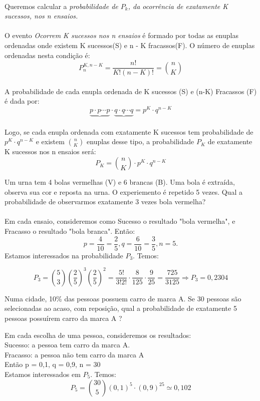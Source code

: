\documentclass[10pt,a4paper]{article}
\begin{document}
\paragraph{} Queremos calcular a \emph{probabilidade de $P_{k}$, da ocorrência de exatamente K sucessos, nos n ensaios.}
\paragraph{}O evento \textit{Ocorrem K sucessos nos n ensaios} é formado por todas as enuplas ordenadas onde existem K sucessos(S) e n - K fracassos(F). O número de enuplas ordenadas nesta condição é:
\[
	P^{K, n-K}_{n} = \frac{n!}{K!(n-K)!} = \binom{n}{K}
\]
\paragraph{}A probabilidade de cada enupla ordenada de K sucessos (S) e (n-K) Fracassos (F) é dada por:
\[
	\underbrace{p \cdot p \cdots p} \cdot \underbrace{q \cdot q \cdots q} = p^{K}\cdot q^{n-K}
\]
\paragraph{}Logo, se cada enupla ordenada com exatamente K sucessos tem probabilidade de $p^{K} \cdot q^{n-K}$ e existem $\binom{n}{K}$ enuplas desse tipo, a probabilidade $P_{K}$ de exatamente K sucessos nos n ensaios será:
\[
	P_{K} = \binom{n}{K} \cdot p^{K} \cdot q^{n-K}
\]

\begin{eg}
	Um urna tem 4 bolas vermelhas (V) e 6 brancas (B). Uma bola é extraída, observa sua cor e reposta na urna. O experiemento é repetido 5 vezes. Qual a probabilidade de observarmos exatamente 3 vezes bola vermelha?
	\paragraph{} Em cada ensaio, consideremos como Sucesso o resultado "bola vermelha", e Fracasso o resultado "bola branca". Então:
	\[
		p = \frac{4}{10} = \frac{2}{5}, q = \frac{6}{10} = \frac{3}{5}, n = 5.	
	\]
	Estamos interessados na probabilidade $P_{3}$. Temos:
	
	\[
		P_{3} = \binom{5}{3}(\frac{2}{5})^{3} (\frac{2}{5})^{2} = \frac{5!}{3!2!} \cdot \frac{8}{125} \cdot \frac{9}{25} = \frac{725}{3125} \Rightarrow
		P_{3} = 0,2304
	\]
\end{eg}

\begin{eg}
	Numa cidade, 10\% das pessoas possuem carro de marca A. Se 30 pessoas são selecionadas ao acaso, com reposição, qual a probabilidade de exatamente 5 pessoas possuírem carro da marca A ?
	
	Em cada escolha de uma pessoa, consideremos os resultados:\\
	Sucesso: a pessoa tem carro da marca A.\\
	Fracasso: a pessoa não tem carro da marca A\\
	Então p = 0,1,    q = 0,9,    n = 30\\
	Estamos interessados em $P_{5}$. Temos:
	\[
		P_{5} = \binom{30}{5}(0,1)^{5} \cdot (0,9)^{25} \simeq 0,102	
	\]
\end{eg}
\end{document}

